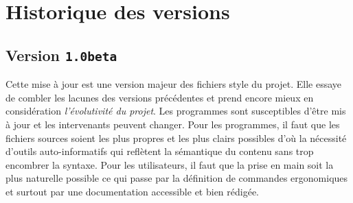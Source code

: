 \documentclass[other,11pt,fonts,openany]{cpgelvrt}
\begin{document}
\section{Historique des versions}

\subsection*{Version \texttt{1.0beta}}
Cette mise à jour est une version majeur des fichiers style du projet. Elle essaye de combler les lacunes des versions précédentes et prend encore mieux en considération \emph{l'évolutivité du projet}. Les programmes sont susceptibles d'être mis à jour et les intervenants peuvent changer. Pour les programmes, il faut que les fichiers sources soient les plus propres et les plus clairs possibles d'où la nécessité d'outils auto-informatifs qui reflètent la sémantique du contenu sans trop encombrer la syntaxe.  Pour les utilisateurs, il faut que la prise en main soit la plus naturelle possible ce qui passe par la définition de commandes ergonomiques et surtout par une documentation accessible et bien rédigée.   
\end{document}
